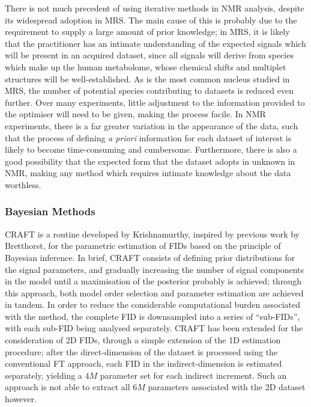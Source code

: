 There is not much precedent of using iterative methods in \ac{NMR} analysis,
despite its widespread adoption in \ac{MRS}. The main cause of this is probably due to
the requirement to supply a large amount of prior knowledge; in \ac{MRS}, it
is likely that the practitioner has an intimate understanding of the expected signals
which will be present in an acquired dataset, since all signals will derive
from species which make up the human metabolome, whose chemical shifts and multiplet
structures will be well-established. As  is the most
common nucleus studied in \ac{MRS}, the number of potential species
contributing to datasets is reduced even further. Over many experiments, little
adjustment to the information provided to the optimiser will need to be given,
making the process facile. In \ac{NMR} experiments, there is a far greater
variation in the appearance of the data, such that the process of defining
\textit{a priori} information for each dataset of interest is likely to become
time-consuming and cumbersome. Furthermore, there is also a good possibility
that the expected form that the dataset adopts in unknown in \ac{NMR}, making
any method which requires intimate knowledge about the data worthless.

\subsubsection{Bayesian Methods}
\Ac{CRAFT}\cite{Krishnamurthy2013,Krishnamurthy2021} is a routine developed by
Krishnamurthy, inspired by previous work by
Bretthorst\cite{Bretthorst1990a,Bretthorst1990b,Bretthorst1990c,Bretthorst1991,Bretthorst1992},
for the parametric estimation of \acp{FID} based on the principle of Bayesian
inference.
In brief, \ac{CRAFT} consists of defining prior distributions for the signal
parameters, and gradually increasing the number of signal components in the
model until a maximisation of the posterior probably is achieved; through this
approach, both model order selection and parameter estimation are achieved
in tandem. In order to reduce the considerable computational burden associated
with the method, the complete \ac{FID} is downsampled into a series of
``sub-\acp{FID}'', with each sub-\ac{FID} being analysed separately.
\ac{CRAFT} has been extended for the consideration of \ac{2D} \acp{FID},
through a simple extension of the \ac{1D} estimation
procedure\cite{Krishnamurthy2017}; after the direct-dimension of the dataset is
processed using the conventional \ac{FT} approach, each \ac{FID} in the
indirect-dimension is estimated separately, yielding a $4M$ parameter
set for each indirect increment. Such an approach is not able to extract all
$6M$ parameters associated with the \ac{2D} dataset however.

